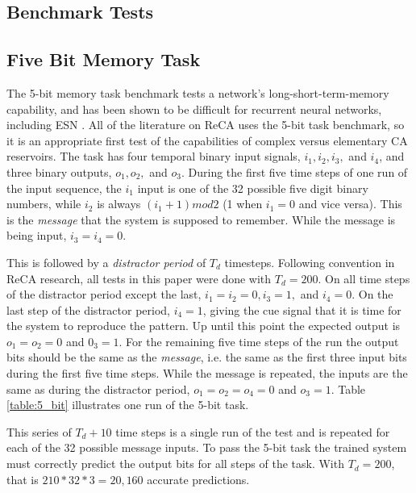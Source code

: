 \documentclass{article}
\begin{document}
\begin{multicols}{2}
\section{Benchmark Tests}\label{Benchmarks}
\subsection{Five Bit Memory Task}\label{5_bit}
The 5-bit memory task benchmark tests a network's long-short-term-memory 
capability, and has been shown to be difficult for recurrent neural networks, 
    including ESN \cite{hochreiter1997long}\cite{jaeger2012long}. All of the 
    literature on ReCA uses the 5-bit task benchmark, so it is an appropriate 
    first test of the capabilities of complex versus elementary CA reservoirs.  
    The task has four temporal binary input signals, $i_1, i_2, i_3,$ and 
    $i_4$, and three binary outputs, $o_1, o_2,$ and $o_3$.  During the
first five time steps of one run of the input sequence, the $i_1$ input is one 
of the 32 possible five digit binary numbers, while $i_2$ is always $(i_1 + 1) 
    mod 2$ (1 when $i_1 = 0$ and vice versa). This is the \textit{message} that 
    the system is supposed to remember. While the message is being input, $i_3 
    = i_4 = 0$.  \par  This is followed by a \textit{distractor period} of 
    $T_d$ timesteps.  Following convention in ReCA research, all tests in this 
    paper were done with $T_d = 200$.  On all time steps of the distractor 
    period except the last, $i_1 = i_2 = 0, i_3 = 1, $ and $i_4 = 0$. On the 
    last step of the distractor period, $i_4 = 1$, giving the cue signal that 
    it is time for the system to reproduce the pattern. Up until this point the 
    expected output is $o_1 = o_2 = 0 $ and $0_3 = 1$. For the remaining five 
    time steps of the run the output bits should be the same as the 
    \textit{message}, i.e.  the same as the first three input bits during the 
    first five time steps.  While the message is repeated, the inputs are the 
    same as during the distractor period, $o_1 = o_2 = o_4 = 0$ and $o_3 = 1$.  
    Table \ref{table:5_bit} illustrates one run of the 5-bit task. \par
    This series of $T_d + 10$ time steps is a single run of the test and is 
    repeated for each of the 32 possible message inputs. To pass the 5-bit task 
    the trained system must correctly predict the output bits for all steps of 
    the task. With $T_d = 200$, that is $210 * 32 * 3 = 20,160$ accurate 
    predictions.


\end{multicols}
\end{document}
